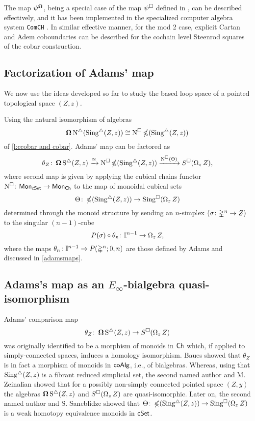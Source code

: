 The map $\psi^{\operatorname{\mathbf{\Omega}}}$, being a special case of the map $\psi^\square$ defined in \cite{medina2020maysteenrod}, can be described effectively, and it has been implemented in the specialized computer algebra system \texttt{ComCH} \cite{medina2021computer}.
In similar effective manner, for the mod 2 case, explicit Cartan and Adem coboundaries \cite{medina2020cartan, medina2020adem} can be described for the cochain level Steenrod squares of the cobar construction.

\subsection{Factorization of Adams' map} \label{ss:factorization of adams}

We now use the ideas developed so far to study the based loop space of a pointed topological space $(Z, z)$.

Using the natural isomorphism of algebras
\[
\operatorname{\mathbf{\Omega}} \operatorname{N^{\triangle}} (\operatorname{Sing^{\triangle}}(Z, z)) \cong \operatorname{N^{\square}} \operatorname{\mathbb{\Omega}} (\operatorname{Sing^{\triangle}}(Z, z))
\]
of \cref{l:ccobar and cobar}.
Adams' map can be factored as
\begin{equation} \label{e:factorization of adams}
\theta_Z \colon \operatorname{\mathbf{\Omega}} \operatorname{S^{\triangle}}(Z, z) \xrightarrow{\cong}
\operatorname{N^{\square}} \operatorname{\mathbb{\Omega}}(\operatorname{Sing^{\triangle}}(Z, z)) \xrightarrow{\operatorname{N^{\square}}(\Theta)}
S^{\square}(\operatorname{\Omega}_z Z),
\end{equation}
where second map is given by applying the cubical chains functor $\operatorname{N^{\square}} \colon \mathsf{Mon}_{\mathsf{cSet}} \to \mathsf{Mon}_{\mathsf{Ch}}$ to the map of monoidal cubical sets
\[
\Theta \colon \operatorname{\mathbb{\Omega}}(\operatorname{Sing^{\triangle}}(Z, z)) \to \operatorname{Sing^{\square}}(\operatorname{\Omega}_z Z)
\]
determined through the monoid structure by sending an $n$-simplex $(\sigma \colon \mathbb{\Delta}^n \to Z)$ to the singular $(n-1)$-cube
\[
P(\sigma) \circ \theta_n \colon \mathbb{I}^{n-1} \to \operatorname{\Omega}_z Z,
\]
where the maps $\theta_n \colon \mathbb{I}^{n-1} \to P(\mathbb{\Delta}^n;0,n)$ are those defined by Adams and discussed in \cref{adamsmaps}.


\subsection{Adams's map as an $E_{\infty}$-bialgebra quasi-isomorphism}

Adams' comparison map
\[
\theta_Z \colon \operatorname{\mathbf{\Omega}} \operatorname{S^{\triangle}}(Z, z) \to S^{\square}(\operatorname{\Omega}_z Z)
\]
was originally identified to be a morphism of monoids in $\mathsf{Ch}$ which, if applied to simply-connected spaces, induces a homology isomorphism.
Baues showed that $\theta_Z$ is in fact a morphism of monoids in $\mathsf{coAlg}$, i.e., of bialgebras.
Whereas, using that $\operatorname{Sing^{\triangle}}(Z, z)$ is a fibrant reduced simplicial set, the second named author and M. Zeinalian \cite{rivera2018cubical} showed that for a possibly non-simply connected pointed space $(Z,y)$ the algebras $\operatorname{\mathbf{\Omega}} \operatorname{S^{\triangle}}(Z, z)$ and $S^{\square}(\operatorname{\Omega}_zZ)$ are quasi-isomorphic.
Later on, the second named author and S. Saneblidze
\cite{rivera2019path} showed that $\Theta \colon \operatorname{\mathbb{\Omega}}(\operatorname{Sing^{\triangle}}(Z, z)) \to \operatorname{Sing^{\square}}(\operatorname{\Omega}_z Z)$ is a weak homotopy equivalence monoids in $\mathsf{cSet}$.

